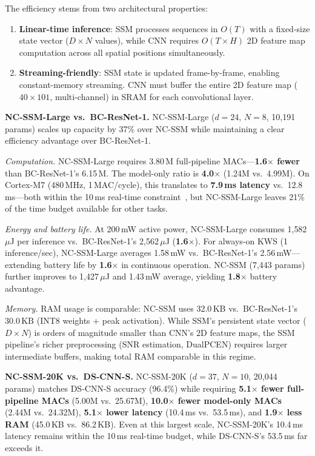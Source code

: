 \documentclass[journal]{IEEEtran}
\begin{document}
The efficiency stems from two architectural properties:
\begin{enumerate}
\setlength\itemsep{0pt}
\item \textbf{Linear-time inference}: SSM processes sequences in $O(T)$ with a fixed-size state vector ($D \times N$ values), while CNN requires $O(T \times H)$ 2D feature map computation across all spatial positions simultaneously.
\item \textbf{Streaming-friendly}: SSM state is updated frame-by-frame, enabling constant-memory streaming. CNN must buffer the entire 2D feature map ($40 \times 101$, multi-channel) in SRAM for each convolutional layer.
\end{enumerate}

\smallskip\noindent\textbf{NC-SSM-Large vs.\ BC-ResNet-1.}
NC-SSM-Large ($d{=}24$, $N{=}8$, 10{,}191 params) scales up capacity by 37\% over NC-SSM while maintaining a clear efficiency advantage over BC-ResNet-1.

\emph{Computation.}
NC-SSM-Large requires 3.80\,M full-pipeline MACs---\textbf{1.6$\times$ fewer} than BC-ResNet-1's 6.15\,M.
The model-only ratio is \textbf{4.0$\times$} (1.24M vs.\ 4.99M).
On Cortex-M7 (480\,MHz, 1\,MAC/cycle), this translates to \textbf{7.9\,ms latency} vs.\ 12.8\,ms---both within the 10\,ms real-time constraint~\cite{banbury2021mlperf}, but NC-SSM-Large leaves 21\% of the time budget available for other tasks.

\emph{Energy and battery life.}
At 200\,mW active power, NC-SSM-Large consumes 1{,}582\,$\mu$J per inference vs.\ BC-ResNet-1's 2{,}562\,$\mu$J (\textbf{1.6$\times$}).
For always-on KWS (1\,inference/sec), NC-SSM-Large averages 1.58\,mW vs.\ BC-ResNet-1's 2.56\,mW---extending battery life by \textbf{1.6$\times$} in continuous operation.
NC-SSM (7{,}443 params) further improves to 1{,}427\,$\mu$J and 1.43\,mW average, yielding \textbf{1.8$\times$} battery advantage.

\emph{Memory.}
RAM usage is comparable: NC-SSM uses 32.0\,KB vs.\ BC-ResNet-1's 30.0\,KB (INT8 weights + peak activation).
While SSM's persistent state vector ($D \times N$) is orders of magnitude smaller than CNN's 2D feature maps, the SSM pipeline's richer preprocessing (SNR estimation, DualPCEN) requires larger intermediate buffers, making total RAM comparable in this regime.

\smallskip\noindent\textbf{NC-SSM-20K vs.\ DS-CNN-S.}
NC-SSM-20K ($d{=}37$, $N{=}10$, 20{,}044 params) matches DS-CNN-S accuracy (96.4\%) while requiring \textbf{5.1$\times$ fewer full-pipeline MACs} (5.00M vs.\ 25.67M), \textbf{10.0$\times$ fewer model-only MACs} (2.44M vs.\ 24.32M), \textbf{5.1$\times$ lower latency} (10.4\,ms vs.\ 53.5\,ms), and \textbf{1.9$\times$ less RAM} (45.0\,KB vs.\ 86.2\,KB).
Even at this largest scale, NC-SSM-20K's 10.4\,ms latency remains within the 10\,ms real-time budget, while DS-CNN-S's 53.5\,ms far exceeds it.
\end{document}
